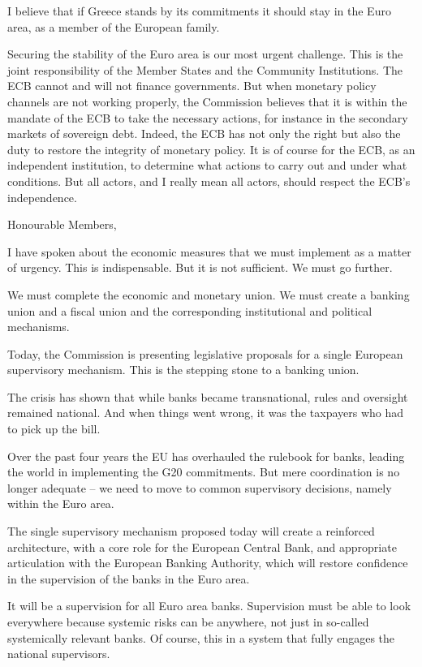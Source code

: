 \documentclass[a4paper,11pt]{article}
\begin{document}
I believe that if Greece stands by its commitments it should stay in the Euro area, as a member of the European family.

Securing the stability of the Euro area is our most urgent challenge. This is the joint responsibility of the Member States and the Community Institutions. The ECB cannot and will not finance governments. But when monetary policy channels are not working properly, the Commission believes that it is within the mandate of the ECB to take the necessary actions, for instance in the secondary markets of sovereign debt. Indeed, the ECB has not only the right but also the duty to restore the integrity of monetary policy. It is of course for the ECB, as an independent institution, to determine what actions to carry out and under what conditions. But all actors, and I really mean all actors, should respect the ECB's independence.

Honourable Members,

I have spoken about the economic measures that we must implement as a matter of urgency. This is indispensable. But it is not sufficient. We must go further.

We must complete the economic and monetary union. We must create a banking union and a fiscal union and the corresponding institutional and political mechanisms.

Today, the Commission is presenting legislative proposals for a single European supervisory mechanism. This is the stepping stone to a banking union.

The crisis has shown that while banks became transnational, rules and oversight remained national. And when things went wrong, it was the taxpayers who had to pick up the bill.

Over the past four years the EU has overhauled the rulebook for banks, leading the world in implementing the G20 commitments. But mere coordination is no longer adequate – we need to move to common supervisory decisions, namely within the Euro area.

The single supervisory mechanism proposed today will create a reinforced architecture, with a core role for the European Central Bank, and appropriate articulation with the European Banking Authority, which will restore confidence in the supervision of the banks in the Euro area.

It will be a supervision for all Euro area banks. Supervision must be able to look everywhere because systemic risks can be anywhere, not just in so-called systemically relevant banks. Of course, this in a system that fully engages the national supervisors.
\end{document}
